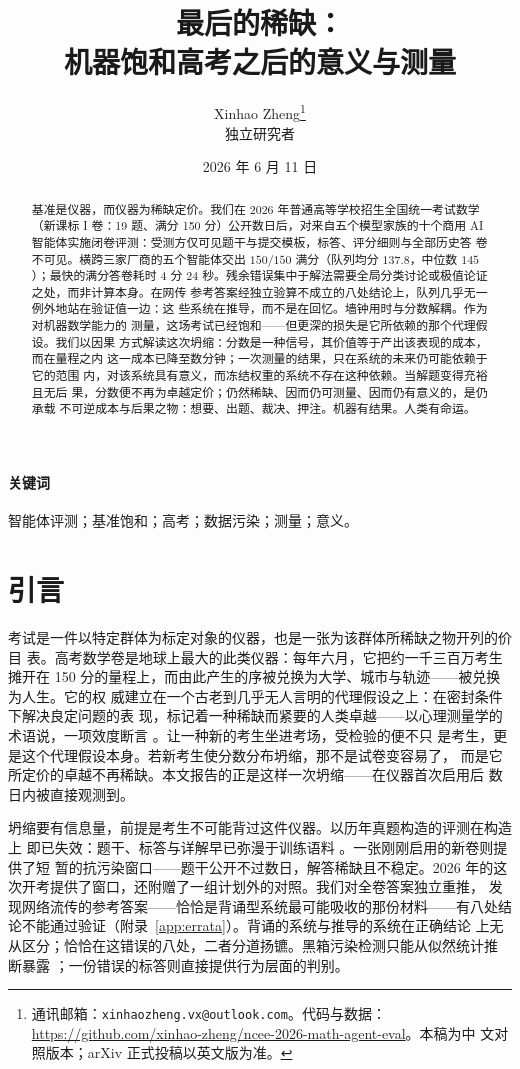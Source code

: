 \documentclass[11pt,UTF8]{ctexart}
\title{\heiti 最后的稀缺：\\[3pt]
  机器饱和高考之后的意义与测量}
\author{%
  Xinhao Zheng\thanks{通讯邮箱：\texttt{xinhaozheng.vx@outlook.com}。代码与数据：
    \url{https://github.com/xinhao-zheng/ncee-2026-math-agent-eval}。本稿为中
    文对照版本；arXiv 正式投稿以英文版为准。}\\[2pt]
  \small 独立研究者}
\date{2026 年 6 月 11 日}
\theoremstyle{definition}
\begin{document}
\maketitle

\begin{abstract}
\noindent
基准是仪器，而仪器为稀缺定价。我们在 2026
年普通高等学校招生全国统一考试数学（新课标 I 卷：19 题、满分 150
分）公开数日后，对来自五个模型家族的十个商用 AI
智能体实施闭卷评测：受测方仅可见题干与提交模板，标答、评分细则与全部历史答
卷不可见。横跨三家厂商的五个智能体交出 $150/150$ 满分（队列均分
$137.8$，中位数 $145$）；最快的满分答卷耗时 4 分 24
秒。残余错误集中于解法需要全局分类讨论或极值论证之处，而非计算本身。在网传
参考答案经独立验算不成立的八处结论上，队列几乎无一例外地站在验证值一边：这
些系统在推导，而不是在回忆。墙钟用时与分数解耦。作为对机器数学能力的
测量，这场考试已经饱和——但更深的损失是它所依赖的那个代理假设。我们以因果
方式解读这次坍缩：分数是一种信号，其价值等于产出该表现的成本，而在量程之内
这一成本已降至数分钟；一次测量的结果，只在系统的未来仍可能依赖于它的范围
内，对该系统具有意义，而冻结权重的系统不存在这种依赖。当解题变得充裕且无后
果，分数便不再为卓越定价；仍然稀缺、因而仍可测量、因而仍有意义的，是仍承载
不可逆成本与后果之物：想要、出题、裁决、押注。机器有结果。人类有命运。
\end{abstract}

\paragraph*{关键词} 智能体评测；基准饱和；高考；数据污染；测量；意义。

\section{引言}

考试是一件以特定群体为标定对象的仪器，也是一张为该群体所稀缺之物开列的价目
表。高考数学卷是地球上最大的此类仪器：每年六月，它把约一千三百万考生摊开在
150
分的量程上，而由此产生的序被兑换为大学、城市与轨迹——被兑换为人生。它的权
威建立在一个古老到几乎无人言明的代理假设之上：在密封条件下解决良定问题的表
现，标记着一种稀缺而紧要的人类卓越——以心理测量学的术语说，一项效度断言
\citep{cronbach1955construct}。让一种新的考生坐进考场，受检验的便不只
是考生，更是这个代理假设本身。若新考生使分数分布坍缩，那不是试卷变容易了，
而是它所定价的卓越不再稀缺。本文报告的正是这样一次坍缩——在仪器首次启用后
数日内被直接观测到。

坍缩要有信息量，前提是考生不可能背过这件仪器。以历年真题构造的评测在构造上
即已失效：题干、标答与详解早已弥漫于训练语料
\citep{carlini2023quantifying,zhang2024careful}。一张刚刚启用的新卷则提供了短
暂的抗污染窗口——题干公开不过数日，解答稀缺且不稳定。2026
年的这次开考提供了窗口，还附赠了一组计划外的对照。我们对全卷答案独立重推，
发现网络流传的参考答案——恰恰是背诵型系统最可能吸收的那份材料——有八处结
论不能通过验证（附录~\ref{app:errata}）。背诵的系统与推导的系统在正确结论
上无从区分；恰恰在这错误的八处，二者分道扬镳。黑箱污染检测只能从似然统计推
断暴露 \citep{oren2024proving}；一份错误的标答则直接提供行为层面的判别。
\end{document}
